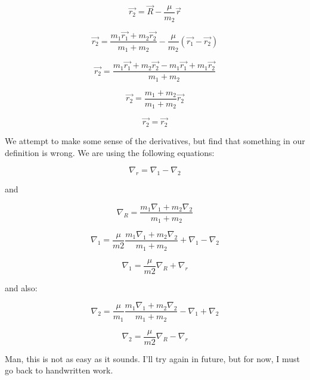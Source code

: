 \documentclass[aps,pre,nofootinbib]{revtex4}
\begin{document}
\begin{equation}
\vec{r_2} = \vec{R}-\frac{\mu}{m_2} \vec{r}
\end{equation}

\begin{equation}
\vec{r_2} =\frac{m_1 \vec{r_1} + m_2 \vec{r_2}}{m_1 + m_2}-\frac{\mu}{m_2}(\vec{r_1}-\vec{r_2})
\end{equation}

\begin{equation}
\vec{r_2} =\frac{m_1 \vec{r_1} + m_2 \vec{r_2} - m_1 \vec{r_1} + m_1\vec{r_2}}{m_1 + m_2}
\end{equation}

\begin{equation}
\vec{r_2} =\frac{m_1 + m_2}{m_1 + m_2}\vec{r_2}
\end{equation}

\begin{equation}
\vec{r_2} =\vec{r_2}
\end{equation}

We attempt to make some sense of the derivatives, but find that something in our definition is wrong.  We are using the following equations: 
 
\begin{equation}
\nabla_r  = \nabla_1 - \nabla_2
\end{equation}

and

\begin{equation}
\nabla_R = \frac{m_1 \nabla_1 + m_2 \nabla_2}{m_1 + m_2}
\end{equation}

\begin{equation}
\nabla_1 = \frac{\mu}{m2}\frac{m_1 \nabla_1 + m_2 \nabla_2}{m_1 + m_2} + \nabla_1 - \nabla_2
\end{equation}

\begin{equation}
\nabla_1 = \frac{\mu}{m2}\nabla_R + \nabla_r
\end{equation}

and also:

\begin{equation}
\nabla_2 = \frac{\mu}{m_1}\frac{m_1 \nabla_1 + m_2 \nabla_2}{m_1 + m_2} - \nabla_1 + \nabla_2
\end{equation}

\begin{equation}
\nabla_2 = \frac{\mu}{m2}\nabla_R - \nabla_r
\end{equation}

Man, this is not as easy as it sounds.  I'll try again in future, but for now, I must go back to handwritten work.
\end{document}
